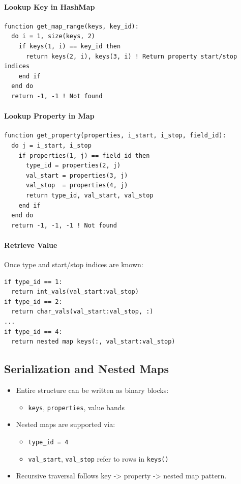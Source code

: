 \documentclass{article}
\begin{document}
\paragraph{Lookup Key in HashMap}
\begin{verbatim}
function get_map_range(keys, key_id):
  do i = 1, size(keys, 2)
    if keys(1, i) == key_id then
      return keys(2, i), keys(3, i) ! Return property start/stop indices
    end if
  end do
  return -1, -1 ! Not found
\end{verbatim}

\paragraph{Lookup Property in Map}
\begin{verbatim}
function get_property(properties, i_start, i_stop, field_id):
  do j = i_start, i_stop
    if properties(1, j) == field_id then
      type_id = properties(2, j)
      val_start = properties(3, j)
      val_stop  = properties(4, j)
      return type_id, val_start, val_stop
    end if
  end do
  return -1, -1, -1 ! Not found
\end{verbatim}

\paragraph{Retrieve Value}
Once type and start/stop indices are known:
\begin{verbatim}
if type_id == 1:
  return int_vals(val_start:val_stop)
if type_id == 2:
  return char_vals(val_start:val_stop, :)
...
if type_id == 4:
  return nested map keys(:, val_start:val_stop)
\end{verbatim}

\subsection{Serialization and Nested Maps}

\begin{itemize}
  \item Entire structure can be written as binary blocks:
    \begin{itemize}
      \item \texttt{keys}, \texttt{properties}, value bands
    \end{itemize}
  \item Nested maps are supported via:
    \begin{itemize}
      \item \texttt{type\_id = 4}
      \item \texttt{val\_start}, \texttt{val\_stop} refer to rows in \texttt{keys()}
    \end{itemize}
  \item Recursive traversal follows key -> property -> nested map pattern.
\end{itemize}
\end{document}

